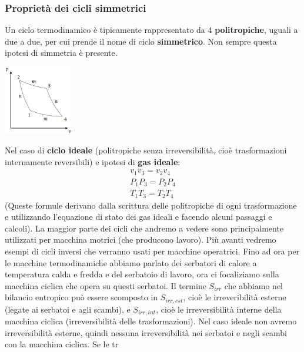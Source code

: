 \subsubsection{Proprietà dei cicli simmetrici}
Un ciclo termodinamico è tipicamente rappresentato da $4$ \textbf{politropiche}, uguali a due a due, per cui prende il nome di ciclo \textbf{simmetrico}. Non sempre questa ipotesi di simmetria è presente.
\begin{center}
    \includegraphics[height=3cm]{../L07/img1.PNG}
\end{center}
Nel caso di \textbf{ciclo ideale} (politropiche senza irreversibilità, cioè trasformazioni internamente reversibili) e ipotesi di \textbf{gas ideale}:
\[
    \begin{matrix}
        v_1v_3 = v_2v_4\\
        P_1P_3 = P_2P_4\\
        T_1T_3 = T_2T_4
    \end{matrix}
\]
(Queste formule derivano dalla scrittura delle politropiche di ogni trasformazione e utilizzando l'equazione di stato dei gas ideali e facendo alcuni passaggi e calcoli).\newline
\newline
La maggior parte dei cicli che andremo a vedere sono principalmente utilizzati per macchina motrici (che producono lavoro). Più avanti vedremo esempi di cicli inversi che verranno usati per macchine operatrici.\newline
\newline
Fino ad ora per le macchine termodinamiche abbiamo parlato dei serbatori di calore a temperatura calda e fredda e del serbatoio di lavoro, ora ci focaliziamo sulla macchina ciclica che opera su questi serbatoi.\newline
\newline
Il termine $S_{irr}$ che abbiamo nel bilancio entropico può essere scomposto in $S_{irr,est}$, cioè le irreveribilità esterne (legate ai serbatoi e agli scambi), e $S_{irr, int}$, cioè le irreversibilità interne della macchina ciclica (irreversibilità delle trasformazioni). Nel caso ideale non avremo irreversibilità esterne, quindi nessuna irreversibilità nei serbatoi e negli scambi con la macchina ciclica. Se le tr
